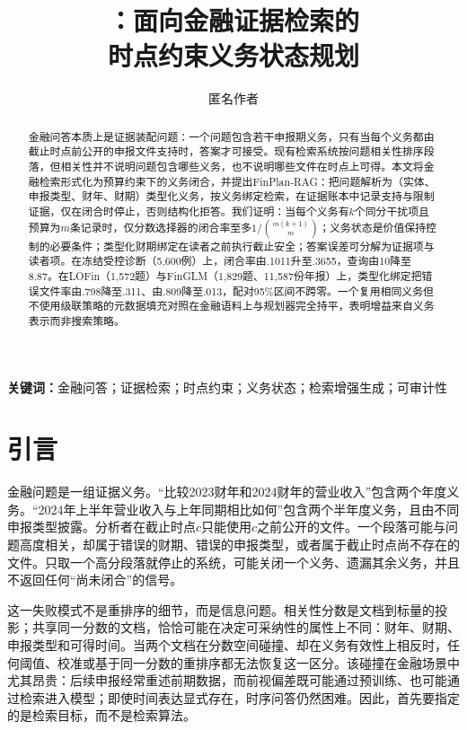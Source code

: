\documentclass[10.5pt,a4paper]{ctexart}
\title{\finplan{}：面向金融证据检索的\\时点约束义务状态规划}
\author{匿名作者}
\date{}
\newcommand{\finplan}{FinPlan\mbox{-}RAG}
\begin{document}
\pagestyle{plain}
\maketitle

\begin{abstract}
金融问答本质上是证据装配问题：一个问题包含若干申报期义务，只有当每个义务都由截止时点前公开的申报文件支持时，答案才可接受。现有检索系统按问题相关性排序段落，但相关性并不说明问题包含哪些义务，也不说明哪些文件在时点上可得。本文将金融检索形式化为预算约束下的义务闭合，并提出\finplan：把问题解析为（实体、申报类型、财年、财期）类型化义务，按义务绑定检索，在证据账本中记录支持与限制证据，仅在闭合时停止，否则结构化拒答。我们证明：当每个义务有$k$个同分干扰项且预算为$m$条记录时，仅分数选择器的闭合率至多$1/\binom{m(k+1)}{m}$；义务状态是价值保持控制的必要条件；类型化财期绑定在读者之前执行截止安全；答案误差可分解为证据项与读者项。在冻结受控诊断（5{,}600例）上，闭合率由.1011升至.3655，查询由10降至8.87。在LOFin（1{,}572题）与FinGLM（1{,}829题、11{,}587份年报）上，类型化绑定把错误文件率由.798降至.311、由.809降至.013，配对95\%区间不跨零。一个复用相同义务但不使用级联策略的元数据填充对照在金融语料上与规划器完全持平，表明增益来自义务表示而非搜索策略。
\end{abstract}

\noindent\textbf{关键词：}金融问答；证据检索；时点约束；义务状态；检索增强生成；可审计性

\section{引言}
金融问题是一组证据义务。“比较2023财年和2024财年的营业收入”包含两个年度义务。“2024年上半年营业收入与上年同期相比如何”包含两个半年度义务，且由不同申报类型披露。分析者在截止时点$c$只能使用$c$之前公开的文件。一个段落可能与问题高度相关，却属于错误的财期、错误的申报类型，或者属于截止时点尚不存在的文件。只取一个高分段落就停止的系统，可能关闭一个义务、遗漏其余义务，并且不返回任何“尚未闭合”的信号。

这一失败模式不是重排序的细节，而是信息问题。相关性分数是文档到标量的投影；共享同一分数的文档，恰恰可能在决定可采纳性的属性上不同：财年、财期、申报类型和可得时间。当两个文档在分数空间碰撞、却在义务有效性上相反时，任何阈值、校准或基于同一分数的重排序都无法恢复这一区分。该碰撞在金融场景中尤其昂贵：后续申报经常重述前期数据，而前视偏差既可能通过预训练、也可能通过检索进入模型\citep{sarkar2025lookahead}；即使时间表达显式存在，时序问答仍然困难\citep{chen2021timeqa,zhu2025fintmmb}。因此，首先要指定的是检索目标，而不是检索算法。
\end{document}
